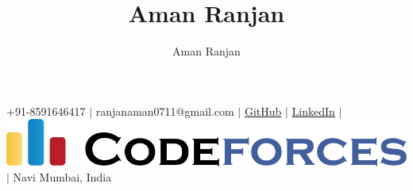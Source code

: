 \documentclass[11pt, letterpaper]{article}
\title{\textbf{Aman Ranjan}}
\author{Aman Ranjan}
\begin{document}
\begin{center}
\maketitle
\faMobilePhone{} +91-8591646417 
$\vert$
\faEnvelopeO{} ranjanaman0711@gmail.com
$\vert$
\faGithubSquare{} \href{https://www.github.com/AmanR0711}{GitHub}
$\vert$
\faLinkedin{} \href{https://www.linkedin.com/in/aman-ranjan-b6662328a/}{LinkedIn}
$\vert$
\href{https://www.codeforces.com/profile/kuchbhi11}{
    \includegraphics[scale=0.05]{assets/codeforces_logo.png}
}
$\vert$
\faMapPin{} Navi Mumbai, India

\end{center}
\end{document}
